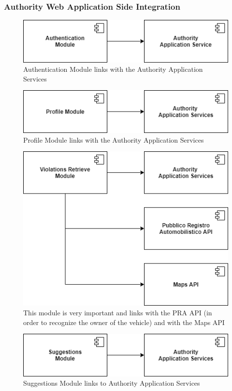 \documentclass[12pt,a4paper]{article}
\begin{document}
\subsubsection{Authority Web Application Side Integration}
\begin{figure}[H]
		\centering
		\includegraphics[width=0.5\linewidth]{../assets/images/auth_mod_auth.png}
		\caption{Authentication Module links with the Authority Application Services}
\end{figure}
\begin{figure}[H]
		\centering
		\includegraphics[width=0.5\linewidth]{../assets/images/prof_mod_auth.png}
		\caption{Profile Module links with the Authority Application Services}
\end{figure}
\begin{figure}[H]
		\centering
		\includegraphics[width=0.5\linewidth]{../assets/images/viol_retr.png}
		\caption{This module is very important and links with the PRA API (in order to recognize the owner of the vehicle) and with the Maps API}
\end{figure}
\begin{figure}[H]
		\centering
		\includegraphics[width=0.5\linewidth]{../assets/images/sugg_mod.png}
		\caption{Suggestions Module links to Authority Application Services}
\end{figure}
\end{document}
